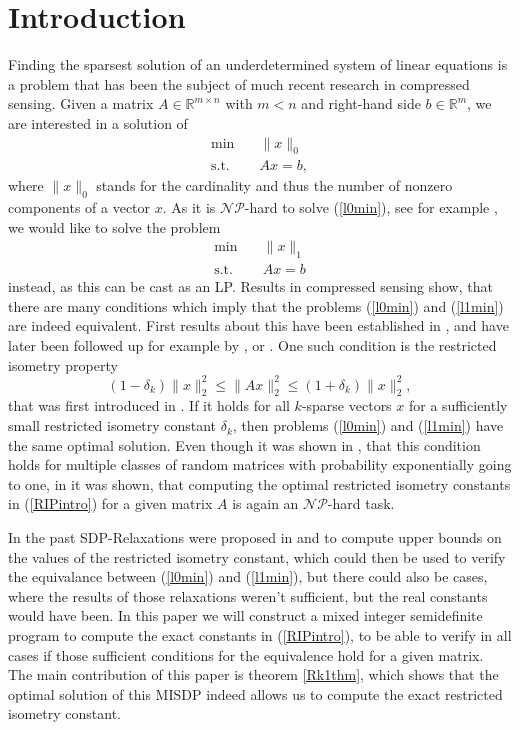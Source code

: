 \documentclass[a4paper,11pt,1p]{elsarticle}
\newcommand{\R}{\mathds{R}}
\begin{document}
\section{Introduction}
Finding the sparsest solution of an underdetermined system of linear equations is a problem that has been the subject of much recent research in compressed sensing. Given a matrix $A \in \R^{m \times n}$ with $m < n$ and 
right-hand side $b \in \R^m$, we are interested in a solution of 
\begin{align}\label{l0min}
 \text{min} \quad & \|x\|_0 \tag{$\ell_0$-min}\\
 \text{s.t.} \quad & Ax = b, \nonumber
\end{align}
where $\|x\|_0$ stands for the cardinality and thus the number of nonzero components of a vector $x$. As it is $\mathcal{NP}$-hard to solve (\ref{l0min}), see for example \cite{GareyJohnson}, we would like to solve the problem
\begin{align}\label{l1min}
 \text{min} \quad & \|x\|_1 \tag{$\ell_1$-min}\\
 \text{s.t.} \quad & Ax = b \nonumber
\end{align}
instead, as this can be cast as an LP. Results in compressed sensing show, that there are many conditions which imply that the problems (\ref{l0min}) and (\ref{l1min}) are indeed equivalent. First results about this have been 
established in \cite{DH01}, and have later been followed up for example by \cite{CRT05}, \cite{Zha08} or \cite{BCT11}. One such condition is the restricted isometry property
\begin{equation}\label{RIPintro}
 (1-\delta_k)\|x\|_2^2 \leq \|Ax\|_2^2 \leq (1+\delta_k)\|x\|_2^2,
\end{equation}
that was first introduced in \cite{CT05}. If it holds for all $k$-sparse vectors $x$ for a sufficiently small restricted isometry constant $\delta_k$, then problems (\ref{l0min}) and (\ref{l1min}) have the same optimal solution. 
Even though it was shown in \cite{BDDW08}, that this condition holds for multiple classes of random matrices with probability exponentially going to one, in \cite{PT14} it was shown, that computing the optimal restricted isometry 
constants in (\ref{RIPintro}) for a given matrix $A$ is again an $\mathcal{NP}$-hard task.

In the past SDP-Relaxations were proposed in \cite{Asp07} and \cite{Asp08} to compute upper bounds on the values of the restricted isometry 
constant, which could then be used to verify the equivalance between (\ref{l0min}) and (\ref{l1min}), but there could also be cases, where the results of those relaxations weren't sufficient, but the real constants would have been. 
In this paper we will construct a mixed integer semidefinite program to compute the exact constants in (\ref{RIPintro}), to be able to verify in all cases if those sufficient conditions for the equivalence hold for a given matrix. 
The main contribution of this paper is theorem \ref{Rk1thm}, which shows
that the optimal solution of this MISDP indeed allows us to compute the
exact restricted isometry constant.
\end{document}
